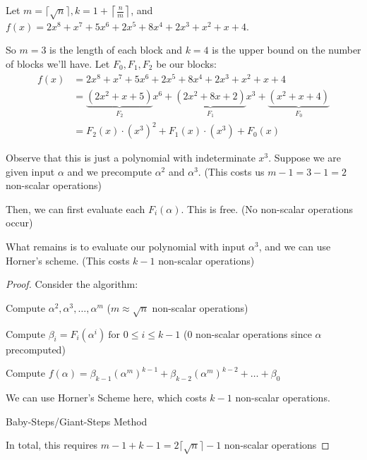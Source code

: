 \begin{example}
    Let $m = \lceil \sqrt{n} \rceil, k = 1 + \left\lceil \frac{n}{m} \right\rceil$, and $f(x) = 2x^8 + x^7 + 5x^6 + 2x^5 + 8x^4 + 2x^3 + x^2 + x + 4$.

    So $m = 3$ is the length of each block and $k = 4$ is the upper bound on the number of blocks we'll have.
    Let $F_0, F_1, F_2$ be our blocks:
    \begin{align*}
        f(x) &= 2x^8 + x^7 + 5x^6 + 2x^5 + 8x^4 + 2x^3 + x^2 + x + 4 \\
        &= \underbrace{(2x^2 + x + 5)}_{F_2}x^6 + 
        \underbrace{(2x^2 + 8x + 2)}_{F_1}x^3 + 
        \underbrace{(x^2 + x + 4)}_{F_0} \\
        &= F_2(x)\cdot(x^3)^2 + F_1(x)\cdot(x^3) + F_0(x)
    \end{align*}

    Observe that this is just a polynomial with indeterminate $x^3$.
    Suppose we are given input $\alpha$ and we precompute $\alpha^2$ and $\alpha^3$. (This costs us $m - 1 = 3 - 1 = 2$ non-scalar operations)
    
    Then, we can first evaluate each $F_i(\alpha)$.
    This is free. (No non-scalar operations occur)

    What remains is to evaluate our polynomial with input $\alpha^3$, and we can use Horner's scheme. (This costs $k - 1$ non-scalar operations)
\end{example}

\begin{proof}
    Consider the algorithm:

    \IncMargin{1em}
    \begin{algorithm}[H]
        \nl Compute $\alpha^2, \alpha^3, \ldots, \alpha^m$ ($m \approx \sqrt{n}$ non-scalar operations)

        \nl Compute $\beta_i = F_i(\alpha^i) \ \text{for } 0 \leq i \leq k - 1$ ($0$ non-scalar operations since $\alpha$ precomputed)

        \nl Compute $f(\alpha) = \beta_{k-1}(\alpha^m)^{k-1} + \beta_{k-2}(\alpha^m)^{k-2} + \ldots + \beta_0$

        We can use Horner's Scheme here, which costs $k-1$ non-scalar operations.

        \caption{Baby-Steps/Giant-Steps Method}
    \end{algorithm}

    In total, this requires $m - 1 + k - 1 = 2\lceil\sqrt{n}\rceil - 1$ non-scalar operations
\end{proof}


